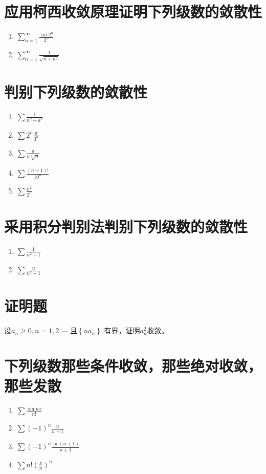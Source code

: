 \documentclass[a4paper,12pt]{article}
\begin{document}
\section{应用柯西收敛原理证明下列级数的敛散性}
\begin{enumerate}[label={\rm(\arabic*)}]
    \item $\displaystyle \sum_{n=1}^{\infty} \frac{\sin 2^n}{2^n}$
    \item $\displaystyle \sum_{n=1}^{\infty} \frac{1}{\sqrt{n+n^2}}$
\end{enumerate}
 
\section{判别下列级数的敛散性}
\begin{enumerate}[label={\rm(\arabic*)}]
    \item $\displaystyle \sum \frac{1}{n^2 + a^2}$
    \item $\displaystyle \sum 2^n\frac{\pi}{3^n}$
    \item $\displaystyle \sum \frac{\pi}{n\sqrt[n]n}$
    \item $\displaystyle \sum \frac{(n+1)!}{10^n}$
    \item $\displaystyle \sum \frac{n^2}{2^n}$
\end{enumerate}

\section{采用积分判别法判别下列级数的敛散性}
\begin{enumerate}[label={\rm(\arabic*)}]
    \item $\displaystyle \sum \frac{1}{n^2 + 1}$
    \item $\displaystyle \sum \frac{n}{n^2 + 1}$
\end{enumerate}

\section{证明题}
设$\displaystyle a_n \ge 0, n = 1,2, \cdots$ 且$\displaystyle \left\{na_n\right\}$
有界，证明$\displaystyle a_n^2$收敛。 

\section{下列级数那些条件收敛，那些绝对收敛，那些发散}
\begin{enumerate}[label={\rm(\arabic*)}]
    \item $\displaystyle \sum \frac{\sin nx}{n!}$
    \item $\displaystyle \sum (-1)^n\frac{n}{n+1}$
    \item $\displaystyle \sum (-1)^n\frac{\ln (n+1)}{n+1}$
    \item $\displaystyle \sum n! \left(\frac{x}{n}\right)^n$
\end{enumerate}
\end{document}
